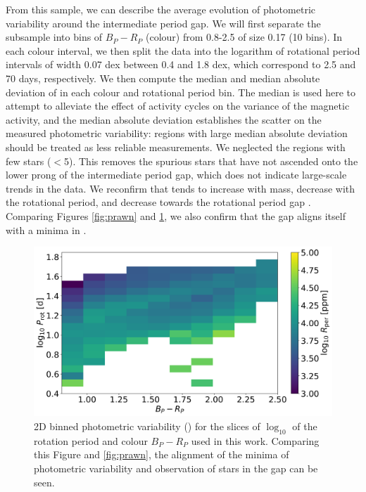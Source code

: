 From this sample, we can describe the average evolution of photometric variability around the intermediate period gap.
We will first separate the subsample into bins of $B_P - R_P$ (colour) from 0.8-2.5 of size 0.17 (10 bins).
In each colour interval, we then split the data into the logarithm of rotational period intervals of width 0.07 dex between 0.4 and 1.8 dex, which correspond to 2.5 and 70 days, respectively.
We then compute the median and median absolute deviation of \rper{} in each colour and rotational period bin.
The median is used here to attempt to alleviate the effect of activity cycles on the variance of the magnetic activity, and the median absolute deviation establishes the scatter on the measured photometric variability: regions with large median absolute deviation should be treated as less reliable measurements.
We neglected the regions with few stars ($<$5).
This removes the spurious stars that have not ascended onto the lower prong of the intermediate period gap, which does not indicate large-scale trends in the data.
We reconfirm that \rper{} tends to increase with mass, decrease with the rotational period, and decrease towards the rotational period gap \citep{reinhold_stellar_2020, basri_double_2018, santos_surface_2021}.
Comparing Figures \ref{fig:prawn} and \ref{fig:binned_rper_full_sample}, we also confirm that the gap aligns itself with a minima in \rper{}.

\begin{figure}
\centering
  \includegraphics[width=\textwidth]{Figures/rot_gap_figures/rot_dist_binned.png}
  \caption[2D binned photometric variability (\rper{}) for the slices of $\log_{10}$ of the rotation period and colour \gaia{} $B_P-R_P$ used in this work.]{
  2D binned photometric variability (\rper{}) for the slices of $\log_{10}$ of the rotation period and colour \gaia{} $B_P-R_P$ used in this work. Comparing this Figure and \ref{fig:prawn}, the alignment of the minima of photometric variability and observation of stars in the gap can be seen.}
  \label{fig:binned_rper_full_sample}
\end{figure}

